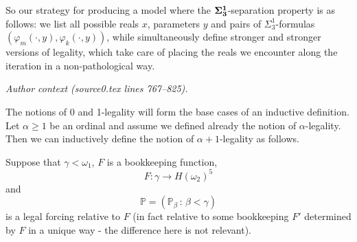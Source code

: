 \documentclass[10pt,a4paper]{amsart}
\newcommand{\forceP}{\mathbb{P}}
\begin{document}
So our strategy for producing a model where the $\bf{\Sigma^1_3}$-separation property is as follows: we list all possible reals $x$, parameters $y$ and pairs of $\Sigma^1_3$-formulas
$(\varphi_m(\cdot,y), \varphi_k(\cdot,y))$, while simultaneously define stronger and stronger versions of legality, which take care of placing the reals we encounter along the iteration in a non-pathological way.
\par\medskip\noindent\textit{Author context (source0.tex lines 767--825).}\par\smallskip
The notions of 0 and 1-legality will form the base cases of an inductive definition.
Let $\alpha \ge 1$ be an ordinal and assume we defined already the notion of $\alpha$-legality. Then we can inductively define the notion of $\alpha+1$-legality  as follows.

Suppose that $\gamma < \omega_1$, $F$ is a bookkeeping function,  \[F: \gamma \rightarrow H(\omega_2)^5 \] and \[\forceP=(\forceP_{\beta} \, : \, \beta < \gamma)\] is a legal forcing relative to $F$ (in fact relative to some bookkeeping $F'$ determined by $F$ in a unique way - the difference here is not relevant). 
\end{document}
